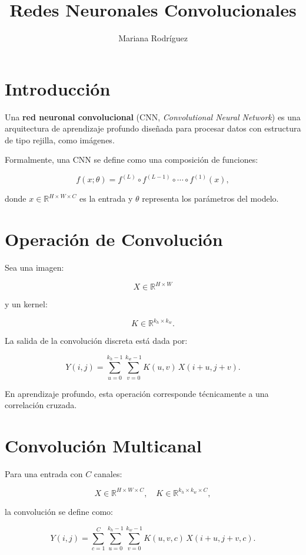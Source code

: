\documentclass[
  letterpaper,
  DIV=11,
  numbers=noendperiod]{scrartcl}
\title{Redes Neuronales Convolucionales}
\author{Mariana Rodríguez}
\date{}
\begin{document}
\maketitle


\section{Introducción}\label{introducciuxf3n}

Una \textbf{red neuronal convolucional} (CNN, \emph{Convolutional Neural
Network}) es una arquitectura de aprendizaje profundo diseñada para
procesar datos con estructura de tipo rejilla, como imágenes.

Formalmente, una CNN se define como una composición de funciones:

\[
f(x; \theta) = f^{(L)} \circ f^{(L-1)} \circ \cdots \circ f^{(1)}(x),
\]

donde \(x \in \mathbb{R}^{H \times W \times C}\) es la entrada y
\(\theta\) representa los parámetros del modelo.

\section{Operación de Convolución}\label{operaciuxf3n-de-convoluciuxf3n}

Sea una imagen:

\[
X \in \mathbb{R}^{H \times W}
\]

y un kernel:

\[
K \in \mathbb{R}^{k_h \times k_w}.
\]

La salida de la convolución discreta está dada por:

\[
Y(i,j) = \sum_{u=0}^{k_h-1} \sum_{v=0}^{k_w-1} K(u,v)\, X(i+u, j+v).
\]

En aprendizaje profundo, esta operación corresponde técnicamente a una
correlación cruzada.

\section{Convolución Multicanal}\label{convoluciuxf3n-multicanal}

Para una entrada con \(C\) canales:

\[
X \in \mathbb{R}^{H \times W \times C}, \quad
K \in \mathbb{R}^{k_h \times k_w \times C},
\]

la convolución se define como:

\[
Y(i,j) = \sum_{c=1}^{C} \sum_{u=0}^{k_h-1} \sum_{v=0}^{k_w-1} K(u,v,c)\, X(i+u, j+v, c).
\]
\end{document}
